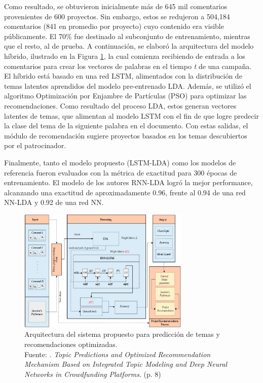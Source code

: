 Como resultado, se obtuvieron inicialmente más de 645 mil comentarios provenientes de 600 proyectos. Sin embargo, estos se redujeron a 504,184 comentarios (841 en promedio por proyecto) cuyo contenido era visible públicamente. El 70\% fue destinado al subconjunto de entrenamiento, mientras que el resto, al de prueba. A continuación, se elaboró la arquitectura del modelo híbrido, ilustrado en la Figura \ref{2:fig128}, la cual comienza recibiendo de entrada a los comentarios para crear los vectores de palabras en el tiempo \textit{t} de una campaña. El híbrido está basado en una red LSTM, alimentados con la distribución de temas latentes aprendidos del modelo pre-entrenado LDA. Además, se utilizó el algoritmo Optimización por Enjambre de Partículas (PSO) para optimizar las recomendaciones. Como resultado del proceso LDA, estos generan vectores latentes de temas, que alimentan al modelo LSTM con el fin de que logre predecir la clase del tema de la siguiente palabra en el documento. Con estas salidas, el módulo de recomendación sugiere proyectos basados en los temas descubiertos por el patrocinador.

Finalmente, tanto el modelo propuesto (LSTM-LDA) como los modelos de referencia fueron evaluados con la métrica de exactitud para 300 épocas de entrenamiento. El modelo de los autores RNN-LDA logró la mejor performance, alcanzando una exactitud de aproximadamente 0.96, frente al 0.94 de una red NN-LDA y 0.92 de una red NN.

\begin{figure}[!ht]
	\begin{center}
		\includegraphics[width=0.73\textwidth]{2/figures/shafqat2019.jpg}
		\caption[Arquitectura del sistema propuesto para predicción de temas y recomendaciones optimizadas]{Arquitectura del sistema propuesto para predicción de temas y recomendaciones optimizadas.\\
		Fuente: \cite{pr_shafqat2019topicpredictions}. \textit{Topic Predictions and Optimized Recommendation Mechanism Based on Integrated Topic Modeling and Deep Neural Networks in Crowdfunding Platforms}. (p. 8)}
		\label{2:fig128}
	\end{center}
\end{figure}

